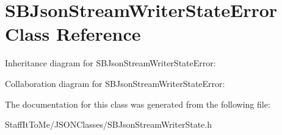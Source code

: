 \hypertarget{interface_s_b_json_stream_writer_state_error}{
\section{\-S\-B\-Json\-Stream\-Writer\-State\-Error \-Class \-Reference}
\label{interface_s_b_json_stream_writer_state_error}
}


\-Inheritance diagram for \-S\-B\-Json\-Stream\-Writer\-State\-Error\-:


\-Collaboration diagram for \-S\-B\-Json\-Stream\-Writer\-State\-Error\-:


\-The documentation for this class was generated from the following file\-:\begin{DoxyCompactItemize}
\item 
\-Staff\-It\-To\-Me/\-J\-S\-O\-N\-Classes/\-S\-B\-Json\-Stream\-Writer\-State.\-h\end{DoxyCompactItemize}
